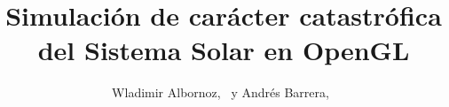 \documentclass[12pt,journal,compsoc]{IEEEtran}
\begin{document}
%
\title{Simulación de carácter catastrófica del Sistema Solar en OpenGL}
%
%
%
%

\author{Wladimir Albornoz,~ y Andrés Barrera,~}%



% 
%
\end{document}
